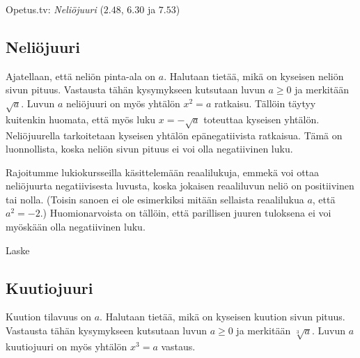 {Opetus.tv: \emph{Neliöjuuri} ($2.48$, $6.30$ ja $7.53$)}

\subsection{Neliöjuuri}

Ajatellaan, että neliön pinta-ala on $a$. Halutaan tietää, mikä on kyseisen neliön sivun pituus. Vastausta tähän kysymykseen kutsutaan luvun $a\ge 0$  ja merkitään $\sqrt{a}$. Luvun $a$ neliöjuuri on myös yhtälön $x^2 = a$ ratkaisu. Tällöin täytyy kuitenkin huomata, että myös luku $x=-\sqrt{a}$ toteuttaa kyseisen yhtälön. Neliöjuurella tarkoitetaan kyseisen yhtälön epänegatiivista ratkaisua. Tämä on luonnollista, koska neliön sivun pituus ei voi olla negatiivinen luku.


Rajoitumme lukiokursseilla käsittelemään reaalilukuja, emmekä voi ottaa neliöjuurta negatiivisesta luvusta, koska jokaisen reaaliluvun neliö on positiivinen tai nolla. (Toisin sanoen ei ole esimerkiksi mitään sellaista reaalilukua $a$, että $a^2=-2$.) Huomionarvoista on tällöin, että parillisen juuren tuloksena ei voi myöskään olla negatiivinen luku.

\begin{esimerkki}
Laske

\begin{esimratk}

\end{esimratk}
	\begin{esimvast}
	\end{esimvast}
\end{esimerkki}


\subsection{Kuutiojuuri}

Kuution tilavuus on $a$. Halutaan tietää, mikä on kyseisen kuution sivun pituus. Vastausta tähän kysymykseen kutsutaan luvun $a\ge 0$  ja merkitään $\sqrt[3]{a}$. Luvun $a$ kuutiojuuri on myös yhtälön $x^3 = a$ vastaus.

